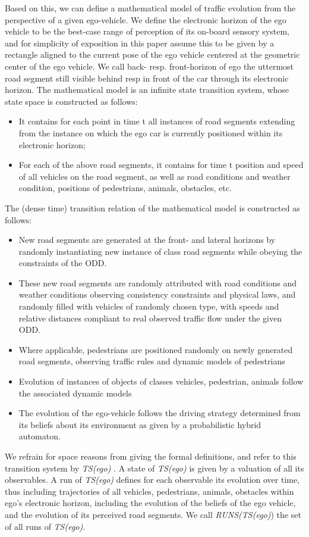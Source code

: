 Based on this, we can define a mathematical model of traffic evolution from the perspective of a given ego-vehicle. We define the electronic horizon of the ego vehicle to be the best-case range of perception of its on-board sensory system, and for simplicity of exposition in this paper assume this to be given by a rectangle aligned to the current pose of the ego vehicle centered at the geometric center of the ego vehicle. We call back- resp. front-horizon of ego the uttermost road segment still visible behind resp in front of the car through its electronic horizon. The mathematical model is an infinite state transition system, whose state space is constructed as follows:
\begin{itemize}
\item It contains for each point in time t  all instances of road segments extending from the instance on which the ego car is currently positioned within its electronic horizon;
\item For each of the above road segments, it contains for time t  position and speed of all vehicles on the road segment, as well as road conditions and weather condition, positions of pedestrians, animals, obstacles, etc.
\end{itemize}
The (dense time) transition relation of the mathematical model is constructed as follows:
\begin{itemize}
\item New road segments are generated at the front- and lateral horizons by randomly instantiating new instance of class road segments while obeying the constraints of the ODD.
\item These new road segments are randomly attributed with road conditions and weather conditions observing consistency constraints and physical laws, and randomly filled with vehicles of randomly chosen type, with speeds and relative distances compliant to real observed traffic flow under the given ODD.
\item Where applicable, pedestrians are positioned randomly on newly generated road segments, observing traffic rules and dynamic models of pedestrians
\item Evolution of instances of objects of classes vehicles, pedestrian, animals follow the associated dynamic models
\item The evolution of the ego-vehicle follows the driving strategy determined from its beliefs about its environment as given by a probabilistic hybrid automaton.
\end{itemize}
We refrain for space reasons from giving the formal definitions, and refer to this transition system by \textit{TS(ego)} . A state of \textit{TS(ego)} is given by a valuation of all its observables. A run of \textit{TS(ego)} defines for each observable its evolution over time, thus including trajectories of all vehicles, pedestrians, animals, obstacles within ego's electronic horizon, including the evolution of the beliefs of the ego vehicle, and the evolution of its perceived road segments. We call \textit{RUNS(TS(ego)}) the set of all runs of \textit{TS(ego)}.

